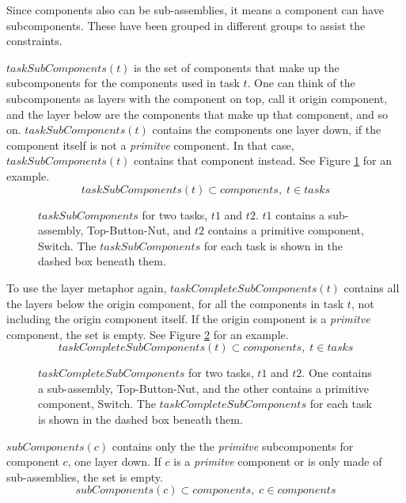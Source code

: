   \noindent Since components also can be sub-assemblies, it means a component can have subcomponents. These have been grouped in different groups to assist the constraints.

  $taskSubComponents(t)$ is the set of components that make up the subcomponents for the components used in task $t$. One can think of the subcomponents as layers with the component on top, call it origin component, and the layer below are the components that make up that component, and so on. $taskSubComponents(t)$ contains the components one layer down, if the component itself is not a \emph{primitve} component. In that case, $taskSubComponents(t)$ contains that component instead. See Figure \ref{fig:taskSubComponents} for an example.
 \begin{equation}\label{eq:53}
 taskSubComponents(t) \subset components, \; t \in tasks
 \end{equation}

 \begin{figure}
 
 \caption{$taskSubComponents$ for two tasks, $t1$ and $t2$. $t1$ contains a sub-assembly, Top-Button-Nut, and $t2$ contains a primitive component, Switch. The $taskSubComponents$ for each task is shown in the dashed box beneath them.}
 \label{fig:taskSubComponents}
 \end{figure}
 
 \noindent To use the layer metaphor again, $taskCompleteSubComponents(t)$ contains all the layers below the origin component, for all the components in task $t$, not including the origin component itself. If the origin component is a \emph{primitve} component, the set is empty. See Figure \ref{fig:taskCompleteSubComponents} for an example.
 \begin{equation}\label{eq:54}
 taskCompleteSubComponents(t) \subset components, \; t \in tasks
 \end{equation}
 
  \begin{figure}
  
  \caption{$taskCompleteSubComponents$ for two tasks, $t1$ and $t2$. One contains a sub-assembly, Top-Button-Nut, and the other contains a primitive component, Switch. The $taskCompleteSubComponents$ for each task is shown in the dashed box beneath them.}
  \label{fig:taskCompleteSubComponents}
  \end{figure}
 
  \noindent $subComponents(c)$ contains only the the \emph{primitve} subcomponents for component $c$, one layer down. If $c$ is a \emph{primitve} component or is only made of sub-assemblies, the set is empty.
 \begin{equation}\label{eq:55}
 subComponents(c) \subset components, \; c \in components
 \end{equation}

